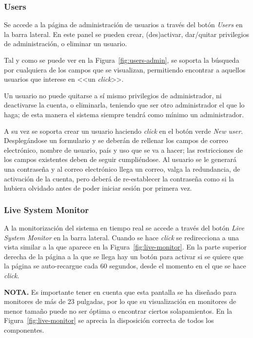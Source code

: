 \subsubsection{Users}
Se accede a la página de administración de usuarios a través del botón \textit{Users} en la barra lateral. En este panel se pueden crear, (des)activar, dar/quitar privilegios de administración, o eliminar un usuario.

Tal y como se puede ver en la Figura~\ref{fig:users-admin}, se soporta la búsqueda por cualquiera de los campos que se visualizan, permitiendo encontrar a aquellos usuarios que interese en <<un \textit{click}>>. 


Un usuario no puede quitarse a sí mismo privilegios de administrador, ni deactivarse la cuenta, o eliminarla, teniendo que ser otro administrador el que lo haga; de esta manera el sistema siempre tendrá como mínimo un administrador.

A su vez se soporta crear un usuario haciendo \textit{click} en el botón verde \textit{New user}. Desplegándose un formulario y se deberán de rellenar los campos de correo electrónico, nombre de usuario, país y uso que se va a hacer; las restricciones de los campos existentes deben de seguir cumpliéndose. Al usuario se le generará una contraseña y al correo electrónico llega un correo, valga la redundancia, de activación de la cuenta, pero deberá de re-establecer la contraseña como si la hubiera olvidado antes de poder iniciar sesión por primera vez.

\subsubsection{Live System Monitor}
A la monitorización del sistema en tiempo real se accede a través del botón \textit{Live System Monitor} en la barra lateral. Cuando se hace \textit{click} se redirecciona a una vista similar a la que aparece en la Figura~\ref{fig:live-monitor}. En la parte superior derecha de la página a la que se llega hay un botón para activar si se quiere que la página se auto-recargue cada 60 segundos, desde el momento en el que se hace \textit{click}.


\textbf{NOTA.} Es importante tener en cuenta que esta pantalla se ha diseñado para monitores de más de 23 pulgadas, por lo que su visualización en monitores de menor tamaño puede no ser óptima o encontrar ciertos solapamientos. En la Figura~\ref{fig:live-monitor} se aprecia la disposición correcta de todos los componentes.

